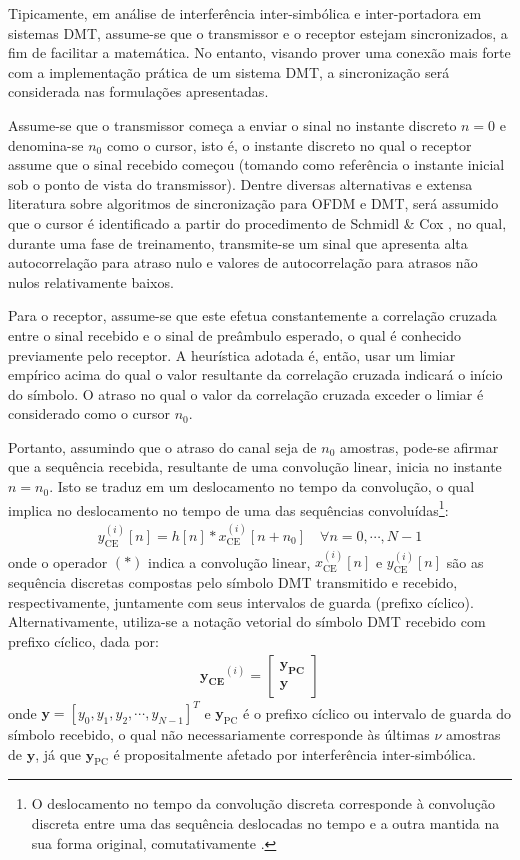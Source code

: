 Tipicamente, em análise de interferência inter-simbólica e inter-portadora em sistemas DMT, assume-se que o transmissor e o receptor estejam sincronizados, a fim de facilitar a matemática. No entanto, visando prover uma conexão mais forte com a implementação prática de um sistema DMT, a sincronização será considerada nas formulações apresentadas.

Assume-se que o transmissor começa a enviar o sinal no instante discreto $n=0$ e denomina-se $n_0$ como o cursor, isto é, o instante discreto no qual o receptor assume que o sinal recebido começou (tomando como referência o instante inicial sob o ponto de vista do transmissor). Dentre diversas alternativas e extensa literatura sobre algoritmos de sincronização para OFDM e DMT, será assumido que o cursor é identificado a partir do procedimento de Schmidl \& Cox \cite{650240}, no qual, durante uma fase de treinamento, transmite-se um sinal que apresenta alta autocorrelação para atraso nulo e valores de autocorrelação para atrasos não nulos relativamente baixos. 

Para o receptor, assume-se que este efetua constantemente a correlação cruzada entre o sinal recebido e o sinal de preâmbulo esperado, o qual é conhecido previamente pelo receptor. A heurística adotada é, então, usar um limiar empírico acima do qual o valor resultante da correlação cruzada indicará o início do símbolo. O atraso no qual o valor da correlação cruzada exceder o limiar é considerado como o cursor $n_0$. 

Portanto, assumindo que o atraso do canal seja de $n_0$ amostras, pode-se afirmar que a sequência recebida, resultante de uma convolução linear, inicia no instante $n=n_0$. Isto se traduz em um deslocamento no tempo da convolução, o qual implica no deslocamento no tempo de uma das sequências convoluídas\footnote{O deslocamento no tempo da convolução discreta corresponde à convolução discreta entre uma das sequência deslocadas no tempo e a outra mantida na sua forma original, comutativamente \cite{dspambardar}. }:
\begin{align}
y_\text{CE}^{(i)}[n]= h[n]*x_\text{CE}^{(i)}[n+n_0] \quad \forall n=0, \cdots, N-1
\label{eq:conv_shift}
\end{align}
onde o operador $(*)$ indica a convolução linear, $x_\text{CE}^{(i)}[n]$ e $y_\text{CE}^{(i)}[n]$ são as sequência discretas compostas pelo símbolo DMT transmitido e recebido, respectivamente, juntamente com seus intervalos de guarda (prefixo cíclico).  Alternativamente, utiliza-se a notação vetorial do símbolo DMT recebido com prefixo cíclico, dada por:
\begin{align}
\mathbf{y_\text{CE}}^{(i)} = 
\left[\begin{array}{c}
\mathbf{y_\text{PC}}\\
\mathbf{y}
\end{array}\right]
\end{align}
onde $\mathbf{y} = \left[y_0, y_1, y_2, \cdots, y_{N-1}\right]^T$ e $\mathbf{y}_\text{PC}$ é o prefixo cíclico ou intervalo de guarda do símbolo recebido, o qual não necessariamente corresponde às últimas $\nu$ amostras de $\mathbf{y}$, já que $\mathbf{y}_\text{PC}$ é propositalmente afetado por interferência inter-simbólica.

